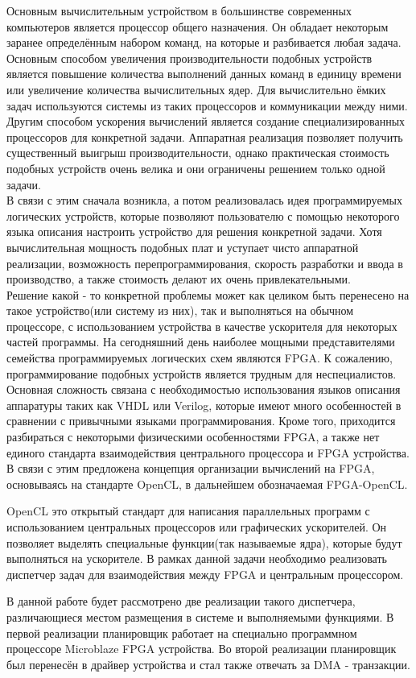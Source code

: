 Основным вычислительным устройством в большинстве современных компьютеров
является процессор общего назначения. Он обладает некоторым
заранее определённым набором команд, на которые и разбивается любая задача.
Основным способом увеличения производительности подобных устройств является
повышение количества выполнений данных команд в единицу времени или увеличение
количества вычислительных ядер. Для вычислительно ёмких задач используются
системы из таких процессоров и коммуникации между ними. Другим способом ускорения вычислений является создание специализированных
процессоров для конкретной задачи. Аппаратная реализация позволяет получить существенный выигрыш
производительности, однако практическая стоимость подобных устройств очень
велика и они ограничены решением только одной задачи.
\\

 В связи с этим сначала
возникла, а потом реализовалась идея программируемых логических устройств,
которые позволяют пользователю с помощью некоторого языка описания настроить
устройство для решения конкретной задачи. Хотя вычислительная мощность подобных плат и уступает
чисто аппаратной реализации, возможность
перепрограммирования, скорость разработки и ввода в производство, а также
стоимость делают их очень привлекательными.
\\

 Решение какой - то конкретной
проблемы может как целиком быть перенесено на такое устройство(или систему из
них), так и выполняться на обычном процессоре, с использованием устройства в
качестве ускорителя для некоторых частей программы. На сегодняшний день наиболее
мощными представителями семейства программируемых логических схем являются FPGA.
К сожалению, программирование подобных устройств является трудным для
неспециалистов. Основная сложность связана с необходимостью использования языков
описания аппаратуры таких как VHDL или Verilog, которые имеют много особенностей
в сравнении с привычными языками программирования. Кроме того, приходится
разбираться с некоторыми физическими особенностями FPGA, а также нет
единого стандарта взаимодействия центрального процессора и FPGA устройства. В
связи с этим предложена концепция организации вычислений на FPGA, основываясь на стандарте OpenCL, в 
дальнейшем обозначаемая FPGA-OpenCL. 

OpenCL это открытый стандарт для
написания параллельных программ с использованием центральных процессоров или графических ускорителей. 
Он позволяет выделять специальные функции(так называемые ядра), которые будут
выполняться на ускорителе. В рамках данной задачи необходимо реализовать
диспетчер задач для взаимодействия между FPGA и центральным процессором.

В данной работе будет рассмотрено две реализации такого диспетчера,
различающиеся местом размещения в системе и выполняемыми функциями. В первой
реализации планировщик работает на специально программном процессоре Microblaze
FPGA устройства. Во второй реализации планировщик был перенесён в
драйвер устройства и стал также отвечать за DMA - транзакции. 
